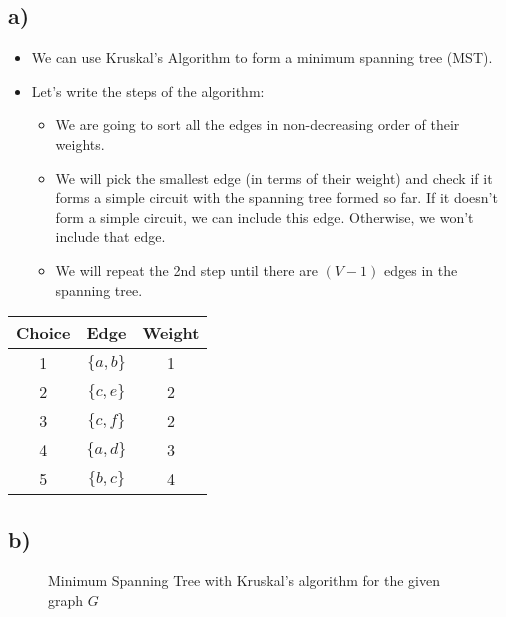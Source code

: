 \documentclass[12pt]{article}
\begin{document}
\subsection*{a)}
\begin{itemize}
 \item We can use Kruskal's Algorithm to form a minimum spanning tree (MST).
 \item Let's write the steps of the algorithm:
 \begin{itemize}
  \item We are going to sort all the edges in non-decreasing order of their weights.
  \item We will pick the smallest edge (in terms of their weight) and check if it forms a simple circuit with the spanning tree formed so far. If it doesn't form a simple circuit, we can include this edge. Otherwise, we won't include that edge.
  \item We will repeat the 2nd step until there are $(V-1)$ edges in the spanning tree.
 \end{itemize}

\end{itemize}

\begin{table}[H]
	\small
	\centering
	\begin{tabular}{|c|c|c|}
	\hline
	Choice & Edge & Weight\\
	\hline
	1 & $\{a,b\}$ & 1\\
	2 & $\{c,e\}$ & 2\\
	3 & $\{c,f\}$ & 2\\
	4 & $\{a,d\}$ & 3\\
	5 & $\{b,c\}$ & 4 \\
	\hline
	\end{tabular}
	\end{table}
\subsection*{b)}
\begin{figure}[H]
	\centering
	\caption{Minimum Spanning Tree with Kruskal's algorithm for the given graph $G$}
\end{figure}
\end{document}
